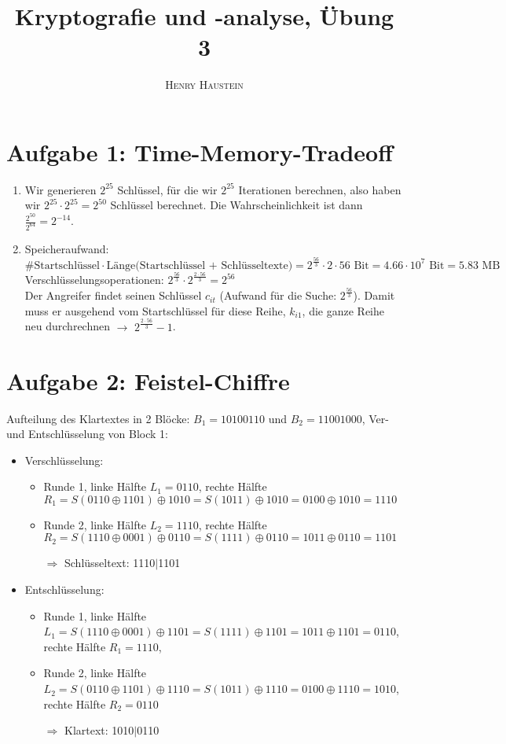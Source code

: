 \documentclass{article}
\title{\textbf{Kryptografie und -analyse, Übung 3}}
\author{\textsc{Henry Haustein}}
\date{}
\begin{document}
	\maketitle
	
	\section*{Aufgabe 1: Time-Memory-Tradeoff}
	\begin{enumerate}[label=(\alph*)]
		\item Wir generieren $2^{25}$ Schlüssel, für die wir $2^{25}$ Iterationen berechnen, also haben wir $2^{25}\cdot 2^{25} = 2^{50}$ Schlüssel berechnet. Die Wahrscheinlichkeit ist dann $\frac{2^{50}}{2^{64}} = 2^{-14}$.
		\item Speicheraufwand: $\text{\# Startschlüssel} \cdot \text{Länge(Startschlüssel + Schlüsseltexte)} = 2^{\frac{56}{3}}\cdot 2\cdot 56\text{ Bit} = 4.66\cdot 10^{7}\text{ Bit} = 5.83\text{ MB}$ \\
		Verschlüsselungsoperationen: $2^{\frac{56}{3}}\cdot 2^{\frac{2\cdot 56}{3}} = 2^{56}$ \\
		Der Angreifer findet seinen Schlüssel $c_{it}$ (Aufwand für die Suche: $2^{\frac{56}{3}}$). Damit muss er ausgehend vom Startschlüssel für diese Reihe, $k_{i1}$, die ganze Reihe neu durchrechnen $\to$ $2^{\frac{2\cdot 56}{3}} - 1$.
	\end{enumerate}

	\section*{Aufgabe 2: Feistel-Chiffre}
	Aufteilung des Klartextes in 2 Blöcke: $B_1 = 10100110$ und $B_2 = 11001000$, Ver- und Entschlüsselung von Block 1:
	\begin{itemize}
		\item Verschlüsselung:
		\begin{itemize}
			\item Runde 1, linke Hälfte $L_1 = 0110$, rechte Hälfte $R_1 = S(0110 \oplus 1101) \oplus 1010 = S(1011) \oplus 1010 = 0100 \oplus 1010 = 1110$
			\item Runde 2, linke Hälfte $L_2 = 1110$, rechte Hälfte $R_2 = S(1110 \oplus 0001) \oplus 0110 = S(1111) \oplus 0110 = 1011 \oplus 0110 = 1101$
			\item[$\Rightarrow$] Schlüsseltext: 1110$\vert$1101
		\end{itemize}
		\item Entschlüsselung:
		\begin{itemize}
			\item Runde 1, linke Hälfte $L_1 = S(1110 \oplus 0001) \oplus 1101 = S(1111) \oplus 1101 = 1011 \oplus 1101 = 0110$, rechte Hälfte $R_1 = 1110$, 
			\item Runde 2, linke Hälfte $L_2 = S(0110 \oplus 1101) \oplus 1110 = S(1011) \oplus 1110 = 0100 \oplus 1110 = 1010$, rechte Hälfte $R_2 = 0110$
			\item[$\Rightarrow$] Klartext: 1010$\vert$0110
		\end{itemize}
	\end{itemize}
	
\end{document}

